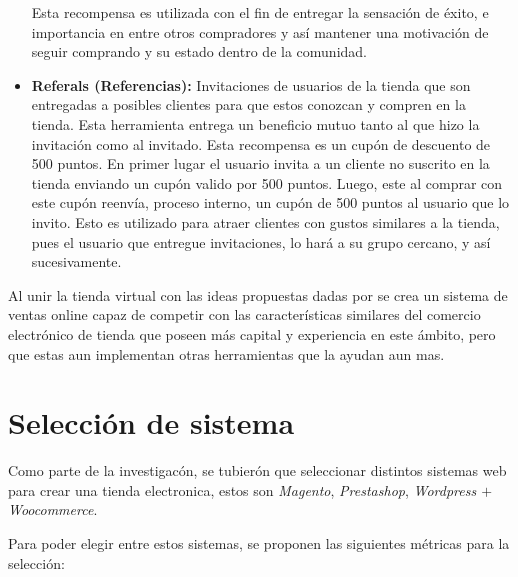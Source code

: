 \begin{itemize}
        Esta recompensa es utilizada con el fin de entregar la sensación de éxito,
        e importancia en entre otros compradores y así mantener una motivación
        de seguir comprando y su estado dentro de la comunidad.

    \item {\bf Referals (Referencias):}
        Invitaciones de usuarios de la tienda que son entregadas a posibles
        clientes para que estos conozcan y compren en la tienda.
        Esta herramienta entrega un beneficio mutuo tanto al que hizo la invitación
        como al invitado. Esta recompensa es un cupón de descuento de 500 puntos.
        En primer lugar el usuario invita a un cliente no suscrito en la tienda
        enviando un cupón valido por 500 puntos.
        Luego, este al comprar con este cupón reenvía,
        proceso interno, un cupón de 500 puntos al usuario que lo invito.
        Esto es utilizado para atraer clientes con gustos similares
        a la tienda, pues el usuario que entregue invitaciones, lo hará a su
        grupo cercano, y así sucesivamente.

\end{itemize}

Al unir la tienda virtual con las ideas propuestas dadas por {\GAM} se crea un
sistema de ventas online capaz de competir con las características similares del
comercio electrónico de tienda que poseen más capital y experiencia en este ámbito,
pero que estas aun implementan otras herramientas que la ayudan aun mas.

\section{Selección de sistema}

Como parte de la investigacón, se tubierón que seleccionar distintos sistemas web para
crear una tienda electronica, estos son \emph{Magento}, \emph{Prestashop}, \emph{Wordpress
$+$ Woocommerce}.

Para poder elegir entre estos sistemas, se proponen las siguientes métricas para
la selección:


